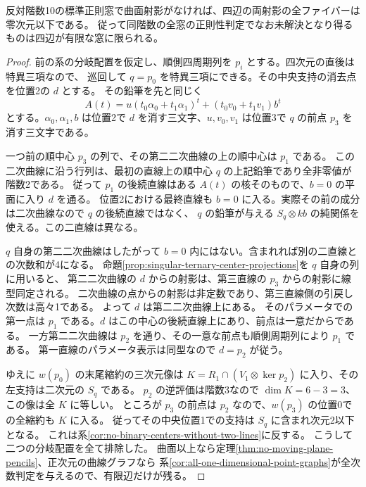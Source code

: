 \begin{theorem}\label{thm:rank-ten-branch-exclusion}
反対階数10の標準正則窓で曲面射影がなければ、四辺の両射影の全ファイバーは零次元以下である。
従って同階数の全窓の正則性判定でなお未解決となり得るものは四辺が有限な窓に限られる。
\end{theorem}
\begin{proof}
前の系の分岐配置を仮定し、順側四周期列を $p_i$ とする。四次元の直後は特異三項なので、
巡回して $q=p_0$ を特異三項にできる。その中央支持の消去点を位置2の $d$ とする。
その鉛筆を先と同じく
\[
       A(t)=u(t_0\alpha_0+t_1\alpha_1)^t+(t_0v_0+t_1v_1)b^t
\]
とする。$\alpha_0,\alpha_1,b$ は位置2で $d$ を消す三文字、$u,v_0,v_1$ は位置3で
$q$ の前点 $p_3$ を消す三文字である。

一つ前の順中心 $p_3$ の列で、その第二二次曲線の上の順中心は $p_1$ である。
この二次曲線に沿う行列は、最初の直線上の順中心 $q$ の上記鉛筆であり全非零値が階数2である。
従って $p_1$ の後続直線はある $A(t)$ の核そのもので、$b=0$ の平面に入り $d$ を通る。
位置2における最終直線も $b=0$ に入る。実際その前の成分は二次曲線なので $q$ の後続直線ではなく、
$q$ の鉛筆が与える $S_q\otimes kb$ の純関係を使える。この二直線は異なる。

$q$ 自身の第二二次曲線はしたがって $b=0$ 内にはない。含まれれば別の二直線との次数和が4になる。
命題\ref{prop:singular-ternary-center-projections}を $q$ 自身の列に用いると、
第二二次曲線の $d$ からの射影は、第三直線の $p_3$ からの射影に線型同定される。
二次曲線の点からの射影は非定数であり、第三直線側の引戻し次数は高々1である。
よって $d$ は第二二次曲線上にある。
そのパラメータでの第一点は $p_1$ である。$d$ はこの中心の後続直線上にあり、前点は一意だからである。
一方第二二次曲線は $p_2$ を通り、その一意な前点も順側周期列により $p_1$ である。
第一直線のパラメータ表示は同型なので $d=p_2$ が従う。

ゆえに $w(p_0)$ の末尾縮約の三次元像は
$K=R_1\cap(V_1\otimes\ker p_2)$ に入り、その左支持は二次元の $S_q$ である。
$p_2$ の逆評価は階数3なので $\dim K=6-3=3$、この像は全 $K$ に等しい。
ところが $p_3$ の前点は $p_2$ なので、$w(p_3)$ の位置0での全縮約も $K$ に入る。
従ってその中央位置1での支持は $S_q$ に含まれ次元2以下となる。
これは系\ref{cor:no-binary-centers-without-two-lines}に反する。
こうして二つの分岐配置を全て排除した。
曲面以上なら定理\ref{thm:no-moving-plane-pencils}、正次元の曲線グラフなら
系\ref{cor:all-one-dimensional-point-graphs}が全次数判定を与えるので、有限辺だけが残る。
\end{proof}
